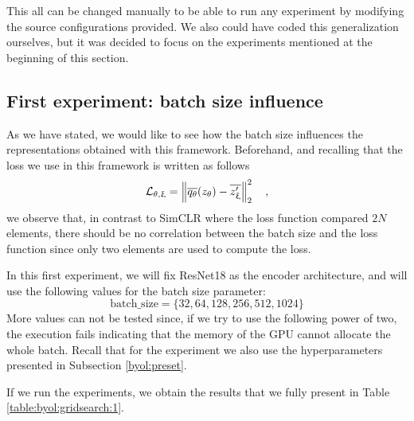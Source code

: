 This all can be changed manually to be able to run any experiment by modifying the source configurations provided. We also could have coded this generalization ourselves, but it was decided to focus on the experiments mentioned at the beginning of this section.

\subsection{First experiment: batch size influence}
\label{experiments:byol:first}

As we have stated, we would like to see how the batch size influences the representations obtained with this framework.  Beforehand, and recalling that the loss we use in this framework is written as follows
\[
\mathcal L_{\theta,\upxi} = \left\lVert\overline{q_\theta}(z_\theta) - \overline{z_\upxi'}\right\rVert_2^2\quad , 
\]
we observe that, in contrast to SimCLR where the loss function compared $2N$ elements, there should be no correlation between the batch size and the loss function since only two elements are used to compute the loss. 

In this first experiment, we will fix ResNet18 as the encoder architecture, and will use the following values for the batch size parameter:
\[
\text{batch\_size} = \{32,64,128,256,512,1024\}    
\]
More values can not be tested since, if we try to use the following power of two, the execution fails indicating that the memory of the GPU cannot allocate the whole batch. Recall that for the experiment we also use the hyperparameters presented in Subsection \ref{byol:preset}.

If we run the experiments, we obtain the results that we fully present in Table \ref{table:byol:gridsearch:1}. 
\begin{table}[H]
    \caption{All results for BYOL's experiment on the influence of batch size.}
    \label{table:byol:gridsearch:1}
    \end{table}

